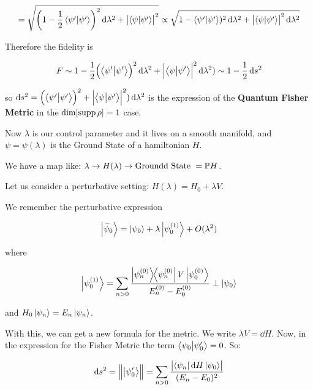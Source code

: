 \documentclass[main.tex]{subfiles}
\begin{document}
\begin{equation}
  = \sqrt{\qty(1 - \frac{1}{2} \braket{\psi'}{\psi'} )^2 \dd{\lambda^2} + \abs{\braket{\psi}{\psi'} }^2 }
  \propto \sqrt{1 - \braket{\psi'}{\psi'} )^2 \dd{\lambda^2}  + \abs{\braket{\psi}{\psi'} }^2 \dd{\lambda^2}}
\end{equation}

Therefore the fidelity is

\begin{equation}
  F \sim 1 - \frac{1}{2} \qty(\braket{\psi'}{\psi'} )^2 \dd{\lambda^2}  + \abs{\braket{\psi}{\psi'} }^2 \dd{\lambda^2})
  \sim 1 - \frac{1}{2}\dd{s^2}
\end{equation}

so \(\dd{s^2} = \qty(\braket{\psi'}{\psi'} )^2  + \abs{\braket{\psi}{\psi'} }^2) \dd{\lambda^2}\)
is the expression of the \textbf{Quantum Fisher Metric} in the \(\dim \qty[ \supp{\rho}] = 1\) case.

Now \(\lambda\) is our control parameter and it lives on a smooth manifold, and \(\psi = \psi(\lambda)\) is the Ground State of a hamiltonian \(H\).

We have a map like: \(\lambda \rightarrow H(\lambda) \rightarrow \text{Groundd State }  = \P H\).

Let us consider a perturbative setting: \(H(\lambda) = H_0 + \lambda V\).

We remember the perturbative expression

\begin{equation}
  \ket{\widetilde{\psi}_0 } = \ket{\psi_0} + \lambda \ket{\psi_0^{(1)}} + O(\lambda^2)
\end{equation}

where

\begin{equation}
  \ket{\psi_0 ^{(1)} } = \sum _{n>0} \frac{\dyad{\psi_n ^{(0)}} V \ket{\psi_0 ^{(0)} }}{E_n ^{(0)}  -  E_0 ^{(0)} } \perp \ket{\psi_0}
\end{equation}

and \(H_0 \ket{\psi_n} = E_n \ket{\psi_n}\).

With this, we can get a new formula for the metric. We write \(\lambda V = \dd{H} \). Now, in the expression for the Fisher Metric the term  \(\braket{\psi_0}{\psi_0 '} = 0 \). So:

\begin{equation}
  \dd{s^2} = \norm{\ket{\psi_0 '}} = \sum _{n>0}  \frac{\abs{\bra{\psi_n} \dd{H} \ket{\psi_0}} }{(E_n - E_0)^2}
\end{equation}
\end{document}
